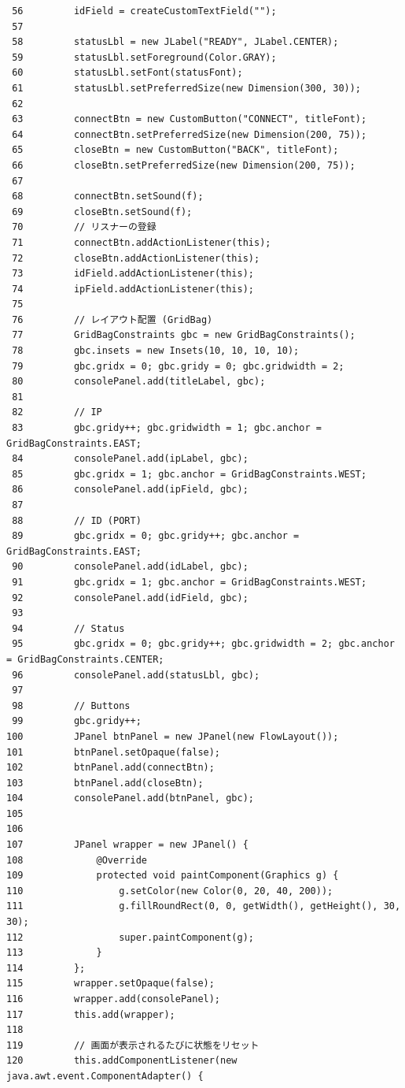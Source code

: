 \documentclass[11pt,a4j]{jarticle}
\begin{document}
\begin{small}
\begin{verbatim}
 56         idField = createCustomTextField("");
 57 
 58         statusLbl = new JLabel("READY", JLabel.CENTER);
 59         statusLbl.setForeground(Color.GRAY);
 60         statusLbl.setFont(statusFont);
 61         statusLbl.setPreferredSize(new Dimension(300, 30));
 62 
 63         connectBtn = new CustomButton("CONNECT", titleFont);
 64         connectBtn.setPreferredSize(new Dimension(200, 75));
 65         closeBtn = new CustomButton("BACK", titleFont);
 66         closeBtn.setPreferredSize(new Dimension(200, 75));
 67 
 68         connectBtn.setSound(f);
 69         closeBtn.setSound(f);
 70         // リスナーの登録 
 71         connectBtn.addActionListener(this);
 72         closeBtn.addActionListener(this);
 73         idField.addActionListener(this);
 74         ipField.addActionListener(this);
 75 
 76         // レイアウト配置 (GridBag)
 77         GridBagConstraints gbc = new GridBagConstraints();
 78         gbc.insets = new Insets(10, 10, 10, 10);
 79         gbc.gridx = 0; gbc.gridy = 0; gbc.gridwidth = 2;
 80         consolePanel.add(titleLabel, gbc);
 81 
 82         // IP
 83         gbc.gridy++; gbc.gridwidth = 1; gbc.anchor = GridBagConstraints.EAST;
 84         consolePanel.add(ipLabel, gbc);
 85         gbc.gridx = 1; gbc.anchor = GridBagConstraints.WEST;
 86         consolePanel.add(ipField, gbc);
 87 
 88         // ID (PORT)
 89         gbc.gridx = 0; gbc.gridy++; gbc.anchor = GridBagConstraints.EAST;
 90         consolePanel.add(idLabel, gbc);
 91         gbc.gridx = 1; gbc.anchor = GridBagConstraints.WEST;
 92         consolePanel.add(idField, gbc);
 93 
 94         // Status
 95         gbc.gridx = 0; gbc.gridy++; gbc.gridwidth = 2; gbc.anchor = GridBagConstraints.CENTER;
 96         consolePanel.add(statusLbl, gbc);
 97 
 98         // Buttons
 99         gbc.gridy++;
100         JPanel btnPanel = new JPanel(new FlowLayout());
101         btnPanel.setOpaque(false);
102         btnPanel.add(connectBtn);
103         btnPanel.add(closeBtn);
104         consolePanel.add(btnPanel, gbc);
105 
106         
107         JPanel wrapper = new JPanel() {
108             @Override
109             protected void paintComponent(Graphics g) {
110                 g.setColor(new Color(0, 20, 40, 200));
111                 g.fillRoundRect(0, 0, getWidth(), getHeight(), 30, 30);
112                 super.paintComponent(g);
113             }
114         };
115         wrapper.setOpaque(false);
116         wrapper.add(consolePanel);
117         this.add(wrapper);
118 
119         // 画面が表示されるたびに状態をリセット
120         this.addComponentListener(new java.awt.event.ComponentAdapter() {

\end{verbatim}
\end{small}
\end{document}
